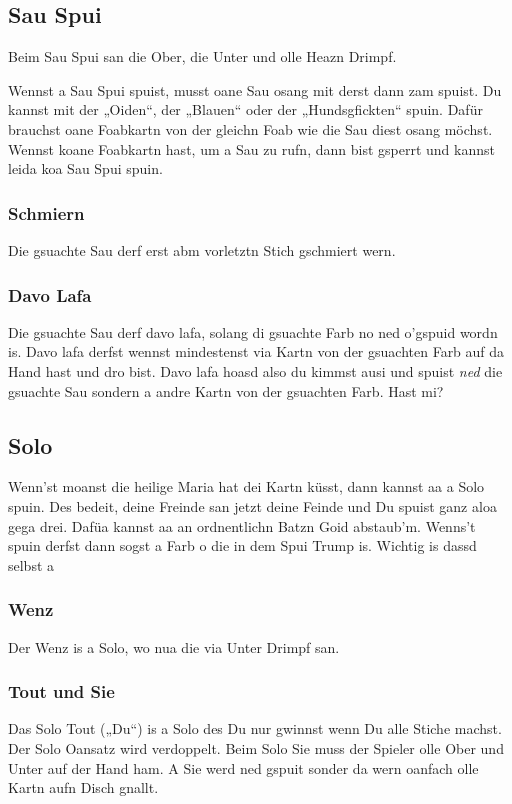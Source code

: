 \documentclass[11pt,a4paper]{scrartcl}		%
\begin{document}
		\subsection{Sau Spui}
		Beim Sau Spui san die Ober, die Unter und olle Heazn Drimpf.

		Wennst a Sau Spui spuist, musst oane Sau osang mit derst dann zam spuist. Du kannst mit der „Oiden“, der „Blauen“ oder der „Hundsgfickten“ spuin.
		Dafür brauchst oane Foabkartn von der gleichn Foab wie die Sau diest osang möchst. Wennst koane Foabkartn hast, um a Sau zu rufn, dann bist gsperrt und kannst leida koa Sau Spui spuin.


			\subsubsection{Schmiern}
			Die gsuachte Sau derf erst abm vorletztn Stich gschmiert wern.

			\subsubsection{Davo Lafa}
			Die gsuachte Sau derf davo lafa, solang di gsuachte Farb no ned o'gspuid wordn is. Davo lafa derfst wennst mindestenst via Kartn von der gsuachten Farb auf da Hand hast und dro bist. Davo lafa hoasd also du kimmst ausi und spuist \emph{ned} die gsuachte Sau sondern a andre Kartn von der gsuachten Farb. Hast mi?

		
		\subsection{Solo}
		Wenn'st moanst die heilige Maria hat dei Kartn küsst, dann kannst aa a Solo spuin. Des bedeit, deine Freinde san jetzt deine Feinde und Du spuist ganz aloa gega drei. Dafüa kannst aa an ordnentlichn Batzn Goid abstaub'm.
		Wenns't spuin derfst dann sogst a Farb o die in dem Spui Trump is. Wichtig is dassd selbst a 

	

			\subsubsection{Wenz}
			Der Wenz is a Solo, wo nua die via Unter Drimpf san.

			\subsubsection{Tout und Sie}
			Das Solo Tout („Du“) is a Solo des Du nur gwinnst wenn Du alle Stiche machst. Der Solo Oansatz wird verdoppelt.
			Beim Solo Sie muss der Spieler olle Ober und Unter auf der Hand ham. A Sie werd ned gspuit sonder da wern oanfach olle Kartn aufn Disch gnallt.
\end{document}
